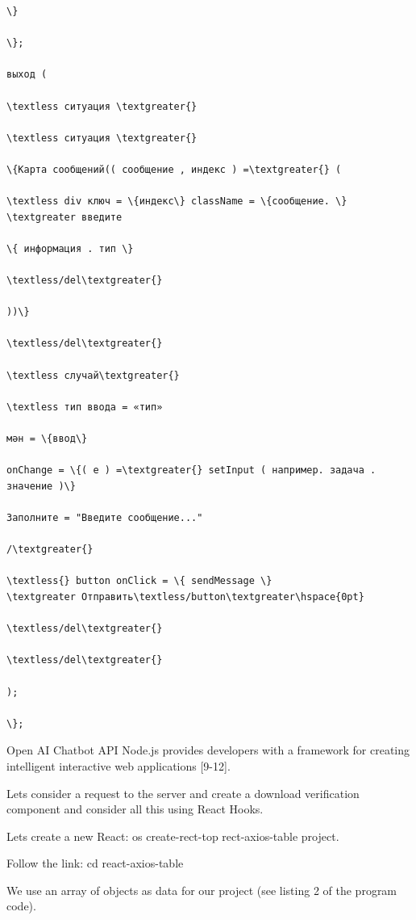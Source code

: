 \begin{verbatim}
\}

\};

выход (

\textless ситуация \textgreater{}

\textless ситуация \textgreater{}

\{Карта сообщений(( сообщение , индекс ) =\textgreater{} (

\textless div ключ = \{индекс\} className = \{сообщение. \}
\textgreater введите

\{ информация . тип \}

\textless/del\textgreater{}

))\}

\textless/del\textgreater{}

\textless случай\textgreater{}

\textless тип ввода = «тип»

мән = \{ввод\}

onChange = \{( e ) =\textgreater{} setInput ( например. задача .
значение )\}

Заполните = "Введите сообщение..."

/\textgreater{}

\textless{} button onClick = \{ sendMessage \}
\textgreater Отправить\textless/button\textgreater\hspace{0pt}

\textless/del\textgreater{}

\textless/del\textgreater{}

);

\};

\end{verbatim}

Open AI Chatbot API Node.js provides developers with a framework for
creating intelligent interactive web applications {[}9-12{]}.

Let\textquotesingle s consider a request to the server and create a
download verification component and consider all this using React Hooks.

Let\textquotesingle s create a new React: os create-rect-top
rect-axios-table project.

Follow the link: cd react-axios-table

We use an array of objects as data for our project (see listing 2 of the
program code).

